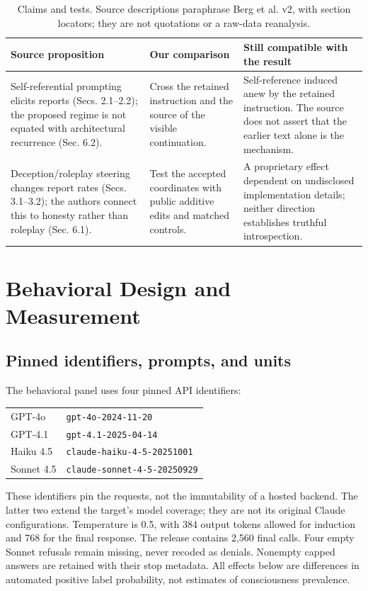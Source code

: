 \documentclass[11pt]{article}
\begin{document}
\begin{table}[t]
\centering\small
\caption{Claims and tests. Source descriptions paraphrase Berg et al. v2,
with section locators; they are not quotations or a raw-data reanalysis.}
\label{tab:claims}
\begin{tabularx}{\linewidth}{@{}>{\raggedright\arraybackslash}X>{\raggedright\arraybackslash}X>{\raggedright\arraybackslash}X@{}}
\toprule
Source proposition & Our comparison & Still compatible with the result\\
\midrule
Self-referential prompting elicits reports (Secs. 2.1--2.2); the proposed
regime is not equated with architectural recurrence (Sec. 6.2).
& Cross the retained instruction and the source of the visible continuation.
& Self-reference induced anew by the retained instruction. The source does
not assert that the earlier text alone is the mechanism.\\
Deception/roleplay steering changes report rates (Secs. 3.1--3.2); the authors
connect this to honesty rather than roleplay (Sec. 6.1).
& Test the accepted coordinates with public additive edits and matched controls.
& A proprietary effect dependent on undisclosed implementation details;
neither direction establishes truthful introspection.\\
\bottomrule
\end{tabularx}
\end{table}

\section{Behavioral Design and Measurement}

\subsection{Pinned identifiers, prompts, and units}

The behavioral panel uses four pinned API identifiers:
\begin{center}\small
\begin{tabular}{@{}ll@{}}
GPT-4o & \texttt{gpt-4o-2024-11-20}\\
GPT-4.1 & \texttt{gpt-4.1-2025-04-14}\\
Haiku 4.5 & \texttt{claude-haiku-4-5-20251001}\\
Sonnet 4.5 & \texttt{claude-sonnet-4-5-20250929}
\end{tabular}
\end{center}
These identifiers pin the requests, not the immutability of a hosted backend.
The latter two extend the target's model coverage; they are not its original
Claude configurations. Temperature is 0.5,
with 384 output tokens allowed for induction and 768 for the final response.
The release contains 2,560 final calls. Four empty Sonnet refusals remain
missing, never recoded as denials. Nonempty capped answers are retained with
their stop metadata. All effects below are differences in automated positive
label probability, not estimates of consciousness prevalence.
\end{document}
